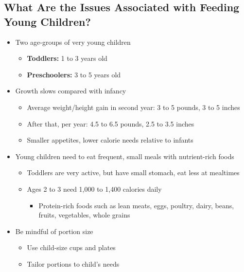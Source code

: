 \documentclass[12pt]{article}
\begin{document}
        \subsection{What Are the Issues Associated with Feeding Young Children?}
            \begin{itemize}
                \item Two age-groups of very young children
                    \begin{itemize}
                        \item \textbf{Toddlers:} 1 to 3 years old
                        \item \textbf{Preschoolers:} 3 to 5 years old
                    \end{itemize}
                \item Growth slows compared with infancy
                    \begin{itemize}
                        \item Average weight/height gain in second year: 3 to 5 pounds, 3 to 5 inches
                        \item After that, per year: 4.5 to 6.5 pounds, 2.5 to 3.5 inches
                        \item Smaller appetites, lower calorie needs relative to infants
                    \end{itemize}
                \item Young children need to eat frequent, small meals with nutrient-rich foods
                    \begin{itemize}
                        \item Toddlers are very active, but have small stomach, eat less at mealtimes
                        \item Ages 2 to 3 need 1,000 to 1,400 calories daily
                            \begin{itemize}
                                \item Protein-rich foods such as lean meats, eggs, poultry, dairy, beans, fruits, vegetables, whole grains
                            \end{itemize}
                    \end{itemize}
                \item Be mindful of portion size
                    \begin{itemize}
                        \item Use child-size cups and plates
                        \item Tailor portions to child's needs

\end{itemize}
\end{itemize}
\end{document}

